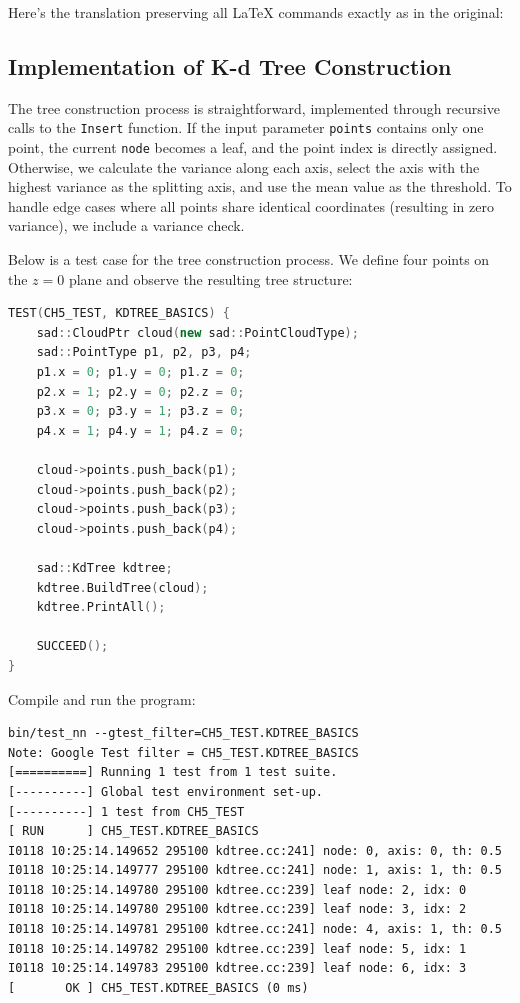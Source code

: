 Here's the translation preserving all LaTeX commands exactly as in the original:

\subsection{Implementation of K-d Tree Construction}
The tree construction process is straightforward, implemented through recursive calls to the \texttt{Insert} function. If the input parameter \texttt{points} contains only one point, the current \texttt{node} becomes a leaf, and the point index is directly assigned. Otherwise, we calculate the variance along each axis, select the axis with the highest variance as the splitting axis, and use the mean value as the threshold. To handle edge cases where all points share identical coordinates (resulting in zero variance), we include a variance check.

Below is a test case for the tree construction process. We define four points on the \( z = 0 \) plane and observe the resulting tree structure:

\begin{lstlisting}[language=c++,caption=src/ch5/test\_nn.cc]
TEST(CH5_TEST, KDTREE_BASICS) {
	sad::CloudPtr cloud(new sad::PointCloudType);
	sad::PointType p1, p2, p3, p4;
	p1.x = 0; p1.y = 0; p1.z = 0;
	p2.x = 1; p2.y = 0; p2.z = 0;
	p3.x = 0; p3.y = 1; p3.z = 0;
	p4.x = 1; p4.y = 1; p4.z = 0;
	
	cloud->points.push_back(p1);
	cloud->points.push_back(p2);
	cloud->points.push_back(p3);
	cloud->points.push_back(p4);
	
	sad::KdTree kdtree;
	kdtree.BuildTree(cloud);
	kdtree.PrintAll();
	
	SUCCEED();
}
\end{lstlisting}

Compile and run the program:
\begin{lstlisting}[caption=Terminal input:]
bin/test_nn --gtest_filter=CH5_TEST.KDTREE_BASICS    
Note: Google Test filter = CH5_TEST.KDTREE_BASICS
[==========] Running 1 test from 1 test suite.
[----------] Global test environment set-up.
[----------] 1 test from CH5_TEST
[ RUN      ] CH5_TEST.KDTREE_BASICS
I0118 10:25:14.149652 295100 kdtree.cc:241] node: 0, axis: 0, th: 0.5
I0118 10:25:14.149777 295100 kdtree.cc:241] node: 1, axis: 1, th: 0.5
I0118 10:25:14.149780 295100 kdtree.cc:239] leaf node: 2, idx: 0
I0118 10:25:14.149780 295100 kdtree.cc:239] leaf node: 3, idx: 2
I0118 10:25:14.149781 295100 kdtree.cc:241] node: 4, axis: 1, th: 0.5
I0118 10:25:14.149782 295100 kdtree.cc:239] leaf node: 5, idx: 1
I0118 10:25:14.149783 295100 kdtree.cc:239] leaf node: 6, idx: 3
[       OK ] CH5_TEST.KDTREE_BASICS (0 ms)
\end{lstlisting}

